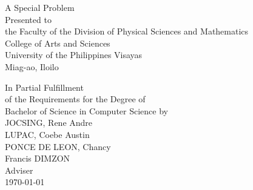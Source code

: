 \begin{titlepage}
\centering


\vspace{1.75cm}
A Special Problem\\
Presented to\\
the Faculty of the Division of Physical Sciences and Mathematics\\
College of Arts and Sciences\\
University of the Philippines Visayas\\
Miag-ao, Iloilo

\vspace{1.75cm}
In Partial Fulfillment\\
of the Requirements for the Degree of\\
Bachelor of Science in Computer Science
\vspace{1.75cm}
by\\

\vspace{1cm}
JOCSING, Rene Andre  \\
LUPAC, Coebe Austin  \\
PONCE DE LEON, Chancy  \\

\vspace{1.75cm}
Francis DIMZON \\
Adviser\\

\vspace{1.75cm}
\today
\end{titlepage}

